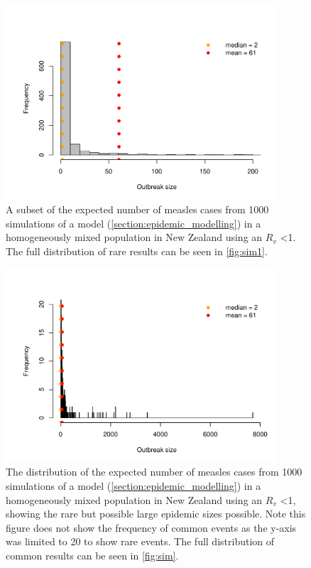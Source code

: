 \documentclass{article}
\begin{document}
\begin{figure}
     \centering
     \includegraphics[width=0.9\textwidth]{sim.pdf}
     \caption{A subset of the expected number of measles cases from 1000 simulations of a model (\autoref{section:epidemic_modelling}) in a homogeneously mixed population in New Zealand using an $R_v$ <1. The full distribution of rare results can be seen in \autoref{fig:sim1}.}
     \label{fig:sim}
\end{figure}

\begin{figure}
     \centering
     \includegraphics[width=0.9\textwidth]{sim1.pdf}
  \caption{The distribution of the expected number of measles cases from 1000 simulations of a model (\autoref{section:epidemic_modelling}) in a homogeneously mixed population in New Zealand using an $R_v$ <1, showing the rare but possible large epidemic sizes possible. 
  Note this figure does not show the frequency of common events as the y-axis was limited to 20 to show rare events. The full distribution of common results can be seen in \autoref{fig:sim}.}
     \label{fig:sim1}
\end{figure}
\end{document}
